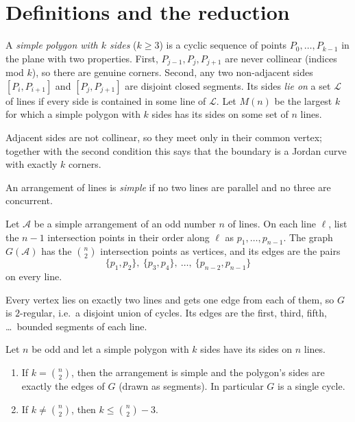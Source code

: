 \section{Definitions and the reduction}\label{sec:reduction}

\begin{definition}
A \emph{simple polygon with $k$ sides} ($k\ge3$) is a cyclic sequence of points $P_0,\dots,P_{k-1}$
in the plane with two properties. First, $P_{j-1},P_j,P_{j+1}$ are never collinear (indices mod $k$),
so there are genuine corners. Second, any two non-adjacent sides $[P_i,P_{i+1}]$ and $[P_j,P_{j+1}]$ are
disjoint closed segments. Its sides \emph{lie on} a set $\mathcal L$ of lines if every side is
contained in some line of $\mathcal L$. Let $M(n)$ be the largest $k$ for which a simple polygon with
$k$ sides has its sides on some set of $n$ lines.
\end{definition}

Adjacent sides are not collinear, so they meet only in their common vertex; together with the second
condition this says that the boundary is a Jordan curve with exactly $k$ corners.

An arrangement of lines is \emph{simple} if no two lines are parallel and no three are concurrent.

\begin{definition}\label{def:G}
Let $\mathcal A$ be a simple arrangement of an odd number $n$ of lines. On each line $\ell$, list the
$n-1$ intersection points in their order along $\ell$ as $p_1,\dots,p_{n-1}$. The graph $G(\mathcal A)$
has the $\binom n2$ intersection points as vertices, and its edges are the pairs
\[
  \{p_1,p_2\},\ \{p_3,p_4\},\ \dots,\ \{p_{n-2},p_{n-1}\}
\]
on every line.
\end{definition}

Every vertex lies on exactly two lines and gets one edge from each of them, so $G$ is $2$-regular, i.e.\
a disjoint union of cycles. Its edges are the first, third, fifth, \dots\ bounded segments of each line.

\begin{proposition}\label{prop:forced}
Let $n$ be odd and let a simple polygon with $k$ sides have its sides on $n$ lines.
\begin{enumerate}
\item If $k=\binom n2$, then the arrangement is simple and the polygon's sides are exactly the edges
  of $G$ (drawn as segments). In particular $G$ is a single cycle.
\item If $k\ne\binom n2$, then $k\le\binom n2-3$.
\end{enumerate}
\end{proposition}


